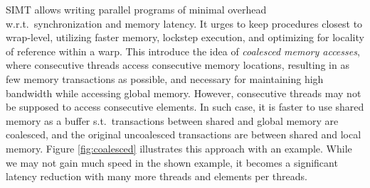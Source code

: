 SIMT allows writing parallel programs of minimal overhead w.r.t.\
synchronization and memory latency. It urges to keep procedures closest to
wrap-level, utilizing faster memory, lockstep execution, and optimizing for
locality of reference within a warp. This introduce the idea of
\textit{coalesced memory accesses}, where consecutive threads access consecutive
memory locations, resulting in as few memory transactions as possible, and
necessary for maintaining high bandwidth while accessing global memory. However,
consecutive threads may not be supposed to access consecutive elements. In such
case, it is faster to use shared memory as a buffer s.t.\ transactions between
shared and global memory are coalesced, and the original uncoalesced
transactions are between shared and local memory. Figure \ref{fig:coalesced}
illustrates this approach with an example. While we may not gain much speed in
the shown example, it becomes a significant latency reduction with many more
threads and elements per threads.

